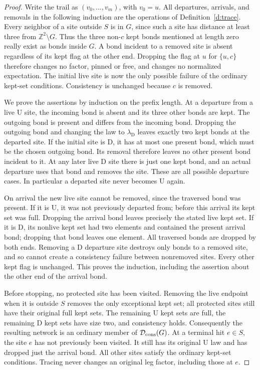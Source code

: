 \begin{proof}
Write the trail as \((v_0,\ldots,v_m)\), with \(v_0=u\).
All departures, arrivals, and removals in the following induction
are the operations of Definition~\ref{d:trace}.
Every neighbor of a site outside \(S\) is in \(G\), since such a
site has distance at least three from \(\mathbb Z^2\setminus G\).
Thus the three non-\(c\) kept bonds mentioned at length zero really
exist as bonds inside \(G\).  A bond incident to a removed site is
absent regardless of its kept flag at the other end.  Dropping the
flag at \(u\) for \(\{u,c\}\) therefore changes no factor, pinned
or free, and changes no normalized expectation.  The initial live
site is now the only possible failure of the ordinary kept-set
conditions.  Consistency is unchanged because \(c\) is removed.

We prove the assertions by induction on the prefix length.  At a
departure from a live \(\mathrm U\) site, the incoming bond is absent
and its three other bonds are kept.  The outgoing bond is present and
differs from the incoming bond.  Dropping the outgoing bond and
changing the law to \(\lambda_{\mathrm D}\) leaves exactly two kept
bonds at the departed site.  If the initial site is \(\mathrm D\),
it has at most one present bond, which must be the chosen outgoing
bond.  Its removal therefore leaves no other present bond incident
to it.  At any later live \(\mathrm D\) site there is just one kept
bond, and an actual departure uses that bond and removes the site.
These are all possible departure cases.  In particular a departed
site never becomes \(\mathrm U\) again.

On arrival the new live site cannot be removed, since the traversed
bond was present.  If it is \(\mathrm U\), it was not previously
departed from; before this arrival its kept set was full.  Dropping
the arrival bond leaves precisely the stated live kept set.  If it
is \(\mathrm D\), its nonlive kept set had two elements and contained
the present arrival bond; dropping that bond leaves one element.
All traversed bonds are dropped by both ends.  Removing a
\(\mathrm D\) departure site destroys only bonds to a removed site,
and so cannot create a consistency failure between nonremoved sites.
Every other kept flag is unchanged.  This proves the induction,
including the assertion about the other end of the arrival bond.

Before stopping, no protected site has been visited.  Removing the
live endpoint when it is outside \(S\) removes the only exceptional
kept set; all protected sites still have their original full kept
sets.  The remaining \(\mathrm U\) kept sets are full, the remaining
\(\mathrm D\) kept sets have size two, and consistency holds.
Consequently the resulting network is an ordinary member of
\(\mathcal D_{\rm cons}(G)\).  At a terminal hit \(e\in S\),
the site \(e\) has not previously been visited.  It still has its
original \(\mathrm U\) law and has dropped just the arrival bond.
All other sites satisfy the ordinary kept-set conditions.  Tracing
never changes an original leg factor, including those at \(e\).


\end{proof}
